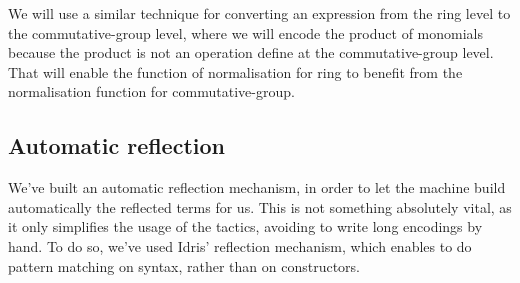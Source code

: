 We will use a similar technique for converting an expression from the ring level to the commutative-group level, where we will encode the product of monomials because the product is not an operation define at the commutative-group level. That will enable the function of normalisation for ring to benefit from the normalisation function for commutative-group.


\subsection{Automatic reflection}
		
We've built an automatic reflection mechanism, in order to let the machine build automatically the reflected terms for us. This is not something absolutely vital, as it only simplifies the usage of the tactics, avoiding to write long encodings by hand. To do so, we've used Idris' reflection mechanism, which enables to do pattern matching on syntax, rather than on constructors. 



